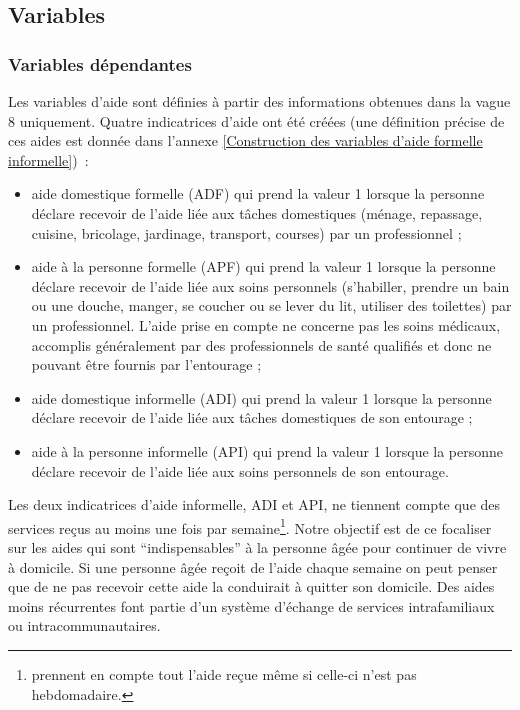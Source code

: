 \begin{Article}
\begin{refsection}[Bonnal]
\subsection{Variables}

\subsubsection{Variables dépendantes}

\noindent Les variables d’aide sont définies à partir des informations obtenues dans la vague 8 uniquement. Quatre indicatrices d’aide ont été créées (une définition précise de ces aides est donnée dans l’annexe \ref{Construction des variables d’aide formelle informelle})~:
\begin{itemize}
\item  aide domestique formelle (ADF) qui prend la valeur 1 lorsque la personne déclare recevoir de l’aide liée aux tâches domestiques (ménage, repassage, cuisine, bricolage, jardinage, transport, courses) par un professionnel ;
\item  aide à la personne formelle (APF) qui prend la valeur 1 lorsque la personne déclare recevoir de l’aide liée aux soins personnels (s'habiller, \linebreak prendre un bain ou une douche, manger, se coucher ou se lever du lit, utiliser des toilettes) par un professionnel. L’aide prise en compte ne concerne pas les soins médicaux, accomplis généralement par des professionnels de santé qualifiés et donc ne pouvant être fournis par l’entourage ;
\item  aide domestique informelle (ADI) qui prend la valeur 1 lorsque la personne déclare recevoir de l’aide liée aux tâches domestiques de son entourage ;
\item  aide à la personne informelle (API) qui prend la valeur 1 lorsque la personne déclare recevoir de l’aide liée aux soins personnels de son entourage.
\end{itemize}

Les deux indicatrices d'aide informelle, ADI et API, ne tiennent compte que des services reçus au moins une fois par semaine\footnote{\textcite{BALIA2014} prennent en compte tout l'aide reçue même si celle-ci n'est pas hebdomadaire.}. Notre objectif est de ce focaliser sur les aides qui sont \enquote{indispensables} à la personne âgée pour continuer de vivre à domicile. Si une personne âgée reçoit de l'aide chaque semaine on peut penser que de ne pas recevoir cette aide la conduirait à quitter son domicile. Des aides moins récurrentes font partie d'un système d'échange de services intrafamiliaux ou intracommunautaires.


\end{refsection}
\end{Article}
